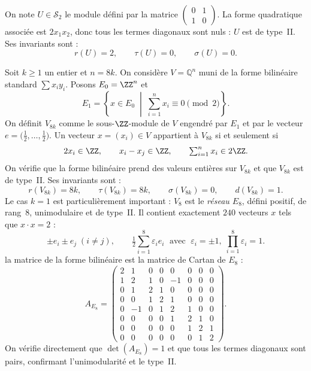 \begin{exemple}
On note $U \in \mathcal{S}_2$ le module défini par la matrice
$\begin{pmatrix} 0 & 1 \\ 1 & 0 \end{pmatrix}$.
La forme quadratique associée est $2x_1 x_2$, donc tous les termes diagonaux sont
nuls : $U$ est de type~II. Ses invariants sont :
\[
  r(U) = 2, \qquad \tau(U) = 0,  \qquad \sigma(U) = 0.
\]
\end{exemple}

\begin{exemple}
\label{ex:V8k}
Soit $k \geq 1$ un entier et $n = 8k$. On considère $V = \mathbb{Q}^n$ muni de la
forme bilinéaire standard $\sum x_i y_i$. Posons $E_0 = \ZZ^n$ et
\[
  E_1 = \left\{ x \in E_0 \;\middle|\; \textstyle\sum_{i=1}^n x_i \equiv 0 \pmod{2} \right\}.
\]
On définit $V_{8k}$ comme le sous-$\ZZ$-module de $V$ engendré par $E_1$ et par le
vecteur $e = \bigl(\tfrac{1}{2}, \ldots, \tfrac{1}{2}\bigr)$. Un vecteur
$x = (x_i) \in V$ appartient à $V_{8k}$ si et seulement si
\[
  2x_i \in \ZZ, \qquad x_i - x_j \in \ZZ, \qquad \textstyle\sum_{i=1}^n x_i \in 2\ZZ.
\]
On vérifie que la forme bilinéaire prend des valeurs entières sur $V_{8k}$ et que $V_{8k}$ est de type~II. Ses invariants sont :
\[
  r(V_{8k}) = 8k, \qquad \tau(V_{8k}) = 8k, \qquad \sigma(V_{8k}) = 0, \qquad d(V_{8k}) = 1.
\]
Le cas $k=1$ est particulièrement important : $V_8$ est le \emph{réseau $E_8$}, défini
positif, de rang~$8$, unimodulaire et de type~II. Il contient exactement $240$ vecteurs
$x$ tels que $x \cdot x = 2$ :
\[
  \pm e_i \pm e_j \; (i \neq j), \qquad
  \tfrac{1}{2}\textstyle\sum_{i=1}^8 \varepsilon_i e_i \;\text{ avec }\;
  \varepsilon_i = \pm 1,\; \textstyle\prod_{i=1}^8 \varepsilon_i = 1.
\]
la matrice de la forme bilinéaire est la matrice de Cartan de $E_8$ :
\[
  A_{E_8} = \begin{pmatrix}
    2  & 1  & 0  & 0  & 0  & 0  & 0  & 0 \\
    1  & 2  & 1  & 0  & -1 & 0  & 0  & 0 \\
    0  & 1  & 2  & 1  & 0  & 0  & 0  & 0 \\
    0  & 0  & 1  & 2  & 1  & 0  & 0  & 0 \\
    0  & -1 & 0  & 1  & 2  & 1  & 0  & 0 \\
    0  & 0  & 0  & 0  & 1  & 2  & 1  & 0 \\
    0  & 0  & 0  & 0  & 0  & 1  & 2  & 1 \\
    0  & 0  & 0  & 0  & 0  & 0  & 1  & 2
  \end{pmatrix}.
\]
On vérifie directement que $\det(A_{E_8}) = 1$ et que tous les termes diagonaux
sont pairs, confirmant l'unimodularité et le type~II.
\end{exemple}

